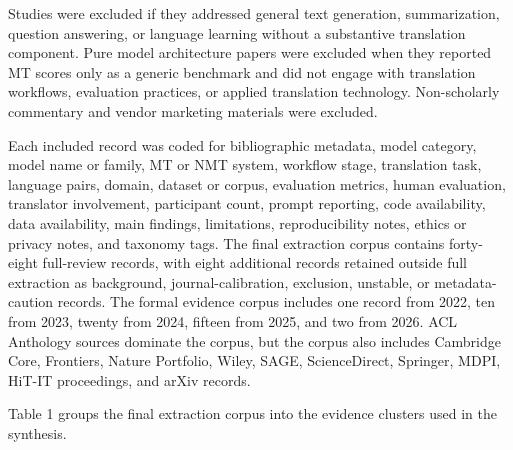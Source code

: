 \documentclass[11pt]{article}
\begin{document}
Studies were excluded if they addressed general text generation, summarization, question answering, or language learning without a substantive translation component. Pure model architecture papers were excluded when they reported MT scores only as a generic benchmark and did not engage with translation workflows, evaluation practices, or applied translation technology. Non-scholarly commentary and vendor marketing materials were excluded.

Each included record was coded for bibliographic metadata, model category, model name or family, MT or NMT system, workflow stage, translation task, language pairs, domain, dataset or corpus, evaluation metrics, human evaluation, translator involvement, participant count, prompt reporting, code availability, data availability, main findings, limitations, reproducibility notes, ethics or privacy notes, and taxonomy tags. The final extraction corpus contains forty-eight full-review records, with eight additional records retained outside full extraction as background, journal-calibration, exclusion, unstable, or metadata-caution records. The formal evidence corpus includes one record from 2022, ten from 2023, twenty from 2024, fifteen from 2025, and two from 2026. ACL Anthology sources dominate the corpus, but the corpus also includes Cambridge Core, Frontiers, Nature Portfolio, Wiley, SAGE, ScienceDirect, Springer, MDPI, HiT-IT proceedings, and arXiv records.

Table 1 groups the final extraction corpus into the evidence clusters used in the synthesis.
\end{document}
